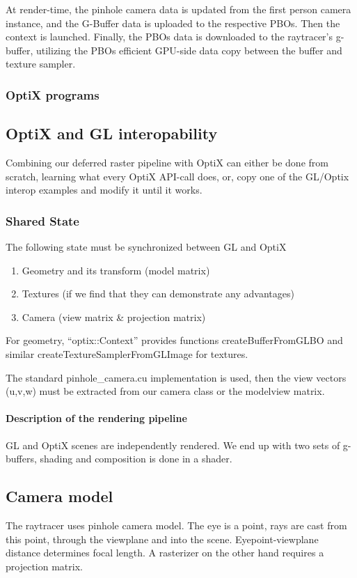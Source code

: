 At render-time, the pinhole camera data is updated from the first person camera instance, and the G-Buffer data is uploaded to the respective PBOs. Then the context is launched. Finally, the PBOs data is downloaded to the raytracer's g-buffer, utilizing the PBOs efficient GPU-side data copy between the buffer and texture sampler.

\subsubsection{OptiX programs}

\subsection{OptiX and GL interopability}
Combining our deferred raster pipeline with OptiX can either be done from scratch, learning what every OptiX API-call does, or, copy one of the GL/Optix interop examples and modify it until it works.

\subsubsection{Shared State}
The following state must be synchronized between GL and OptiX

\begin{enumerate}
	\item Geometry and its transform (model matrix)
	\item Textures (if we find that they can demonstrate any advantages)
	\item Camera (view matrix \& projection matrix)
\end{enumerate}

For geometry, ``optix::Context'' provides functions createBufferFromGLBO and similar createTextureSamplerFromGLImage for textures.

The standard pinhole\_camera.cu implementation is used, then the view vectors (u,v,w) must be extracted from our camera class or the modelview matrix.

\paragraph{Description of the rendering pipeline}

GL and OptiX scenes are independently rendered. We end up with two sets of g-buffers, shading and composition is done in a shader.

\subsection{Camera model}
The raytracer uses pinhole camera model. The eye is a point, rays are cast from this point, through the viewplane and into the scene. Eyepoint-viewplane distance determines focal length. A rasterizer on the other hand requires a projection matrix.

%
